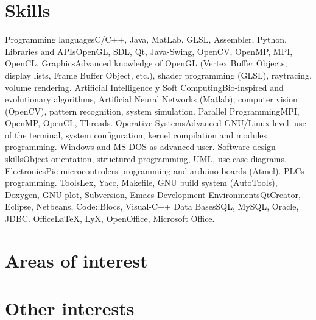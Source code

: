 \documentclass[11pt,a4paper,sans]{moderncv}   %
\begin{document}
\section{Skills}
\cvcomputer
	{Programming languages}{C/C++, Java, MatLab, GLSL, Assembler, Python.}
	{Libraries and APIs}{OpenGL, SDL, Qt, Java-Swing, OpenCV, OpenMP, MPI, OpenCL.}
\cvcomputer
	{Graphics}{Advanced knowledge of OpenGL (Vertex Buffer Objects, display lists, Frame Buffer Object, etc.), shader programming (GLSL), raytracing, volume rendering.}
	{Artificial Intelligence y Soft Computing}{Bio-inspired and evolutionary algorithms, Artificial Neural Networks (Matlab), computer vision (OpenCV), pattern recognition, system simulation.}
\cvcomputer
	{Parallel Programming}{MPI, OpenMP, OpenCL, Threads.}
	{Operative Systems}{Advanced GNU/Linux level: use of the terminal, system configuration, kernel compilation and modules programming. Windows and MS-DOS as advanced user.}
\cvcomputer
	{Software design skills}{Object orientation, structured programming, UML, use case diagrams.}
	{Electronics}{Pic microcontrolers programming and arduino boards (Atmel). PLCs programming.}
\cvcomputer
	{Tools}{Lex, Yacc, Makefile, GNU build system (AutoTools), Doxygen, GNU-plot, Subversion, Emacs}
	{Development Environments}{QtCreator, Eclipse, Netbeans, Code::Blocs, Visual-C++}
\cvcomputer
	{Data Bases}{SQL, MySQL, Oracle, JDBC.}
	{Office}{\LaTeX, LyX, OpenOffice, Microsoft Office.}


\section{Areas of interest}

\section{Other interests}

\end{document}
